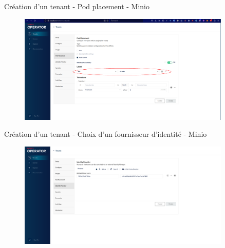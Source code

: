 
\begin{frame}[fragile]{Création d'un tenant - Pod placement - Minio}

\begin{figure}
\begin{center}
\includegraphics[angle=0, width=0.9\textwidth, height=0.9\textheight]{images/pod_placement.eps}
\end{center}
\end{figure}

\end{frame}


\begin{frame}[fragile]{Création d'un tenant - Choix d'un fournisseur d'identité - Minio}

\begin{figure}
\begin{center}
\includegraphics[angle=0, width=0.9\textwidth, height=0.9\textheight]{images/identity_provider_minio.eps}
\end{center}
\end{figure}

\end{frame}

